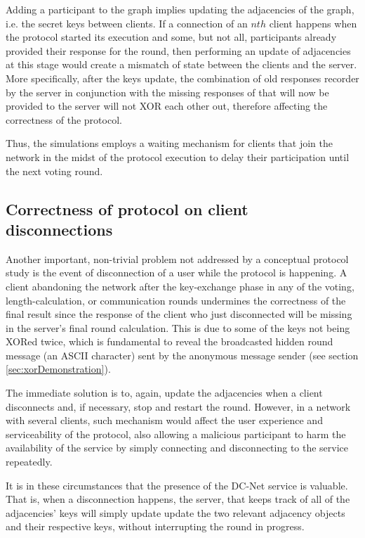 Adding a participant to the graph implies updating the adjacencies of the graph, i.e. the secret keys between clients. If a connection of an $nth$ client happens when the protocol started its execution and some, but not all, participants already provided their response for the round, then performing an update of adjacencies at this stage would create a mismatch of state between the clients and the server. More specifically, after the keys update, the combination of old responses recorder by the server in conjunction with the missing responses of that will now be provided to the server will not XOR each other out, therefore affecting the correctness of the protocol.

Thus, the simulations employs a waiting mechanism for clients that join the network in the midst of the protocol execution to delay their participation until the next voting round.

\subsection{Correctness of protocol on client disconnections}
Another important, non-trivial problem not addressed by a conceptual protocol study is the event of disconnection of a user while the protocol is happening. A client abandoning the network after the key-exchange phase in any of the voting, length-calculation, or communication rounds undermines the correctness of the final result since the response of the client who just disconnected will be missing in the server's final round calculation. This is due to some of the keys not being XORed twice, which is fundamental to reveal the broadcasted hidden round message (an ASCII character) sent by the anonymous message sender (see section \ref{sec:xorDemonstration}).

The immediate solution is to, again, update the adjacencies when a client disconnects and, if necessary, stop and restart the round. However, in a network with several clients, such mechanism would affect the user experience and serviceability of the protocol, also allowing a malicious participant to harm the availability of the service by simply connecting and disconnecting to the service repeatedly.

It is in these circumstances that the presence of the DC-Net service is valuable. That is, when a disconnection happens, the server, that keeps track of all of the adjacencies' keys will simply update update the two relevant adjacency objects and their respective keys, without interrupting the round in progress.

